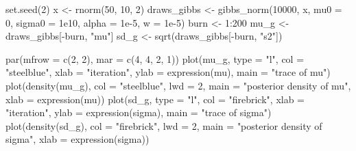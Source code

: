 \documentclass[
  letterpaper,
  DIV=11,
  numbers=noendperiod]{scrreprt}
\newenvironment{Shaded}{\begin{snugshade}}{\end{snugshade}}
\newcommand{\AttributeTok}[1]{\textcolor[rgb]{0.40,0.45,0.13}{#1}}
\newcommand{\DecValTok}[1]{\textcolor[rgb]{0.68,0.00,0.00}{#1}}
\newcommand{\FloatTok}[1]{\textcolor[rgb]{0.68,0.00,0.00}{#1}}
\newcommand{\FunctionTok}[1]{\textcolor[rgb]{0.28,0.35,0.67}{#1}}
\newcommand{\NormalTok}[1]{\textcolor[rgb]{0.00,0.23,0.31}{#1}}
\newcommand{\OtherTok}[1]{\textcolor[rgb]{0.00,0.23,0.31}{#1}}
\newcommand{\SpecialCharTok}[1]{\textcolor[rgb]{0.37,0.37,0.37}{#1}}
\newcommand{\StringTok}[1]{\textcolor[rgb]{0.13,0.47,0.30}{#1}}
\begin{document}
\begin{Shaded}
\begin{Highlighting}[]
\FunctionTok{set.seed}\NormalTok{(}\DecValTok{2}\NormalTok{)}
\NormalTok{x }\OtherTok{\textless{}{-}} \FunctionTok{rnorm}\NormalTok{(}\DecValTok{50}\NormalTok{, }\DecValTok{10}\NormalTok{, }\DecValTok{2}\NormalTok{)}
\NormalTok{draws\_gibbs }\OtherTok{\textless{}{-}} \FunctionTok{gibbs\_norm}\NormalTok{(}\DecValTok{10000}\NormalTok{, x, }\AttributeTok{mu0 =} \DecValTok{0}\NormalTok{, }\AttributeTok{sigma0 =} \FloatTok{1e10}\NormalTok{, }\AttributeTok{alpha =} \FloatTok{1e{-}5}\NormalTok{, }\AttributeTok{w =} \FloatTok{1e{-}5}\NormalTok{)}
\NormalTok{burn }\OtherTok{\textless{}{-}} \DecValTok{1}\SpecialCharTok{:}\DecValTok{200}
\NormalTok{mu\_g  }\OtherTok{\textless{}{-}}\NormalTok{ draws\_gibbs[}\SpecialCharTok{{-}}\NormalTok{burn, }\StringTok{"mu"}\NormalTok{]}
\NormalTok{sd\_g  }\OtherTok{\textless{}{-}} \FunctionTok{sqrt}\NormalTok{(draws\_gibbs[}\SpecialCharTok{{-}}\NormalTok{burn, }\StringTok{"s2"}\NormalTok{])}

\FunctionTok{par}\NormalTok{(}\AttributeTok{mfrow =} \FunctionTok{c}\NormalTok{(}\DecValTok{2}\NormalTok{, }\DecValTok{2}\NormalTok{), }\AttributeTok{mar =} \FunctionTok{c}\NormalTok{(}\DecValTok{4}\NormalTok{, }\DecValTok{4}\NormalTok{, }\DecValTok{2}\NormalTok{, }\DecValTok{1}\NormalTok{))}
\FunctionTok{plot}\NormalTok{(mu\_g, }\AttributeTok{type =} \StringTok{"l"}\NormalTok{, }\AttributeTok{col =} \StringTok{"steelblue"}\NormalTok{, }\AttributeTok{xlab =} \StringTok{"iteration"}\NormalTok{, }\AttributeTok{ylab =} \FunctionTok{expression}\NormalTok{(mu), }\AttributeTok{main =} \StringTok{"trace of mu"}\NormalTok{)}
\FunctionTok{plot}\NormalTok{(}\FunctionTok{density}\NormalTok{(mu\_g), }\AttributeTok{col =} \StringTok{"steelblue"}\NormalTok{, }\AttributeTok{lwd =} \DecValTok{2}\NormalTok{, }\AttributeTok{main =} \StringTok{"posterior density of mu"}\NormalTok{, }\AttributeTok{xlab =} \FunctionTok{expression}\NormalTok{(mu))}
\FunctionTok{plot}\NormalTok{(sd\_g, }\AttributeTok{type =} \StringTok{"l"}\NormalTok{, }\AttributeTok{col =} \StringTok{"firebrick"}\NormalTok{, }\AttributeTok{xlab =} \StringTok{"iteration"}\NormalTok{, }\AttributeTok{ylab =} \FunctionTok{expression}\NormalTok{(sigma), }\AttributeTok{main =} \StringTok{"trace of sigma"}\NormalTok{)}
\FunctionTok{plot}\NormalTok{(}\FunctionTok{density}\NormalTok{(sd\_g), }\AttributeTok{col =} \StringTok{"firebrick"}\NormalTok{, }\AttributeTok{lwd =} \DecValTok{2}\NormalTok{, }\AttributeTok{main =} \StringTok{"posterior density of sigma"}\NormalTok{, }\AttributeTok{xlab =} \FunctionTok{expression}\NormalTok{(sigma))}
\end{Highlighting}
\end{Shaded}
\end{document}
